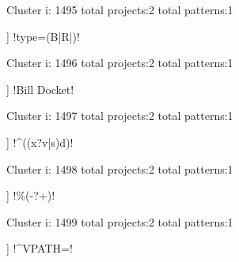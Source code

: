 Cluster i: 1495
total projects:2
total patterns:1
\begin{multicols}{1}
\begin{description}[noitemsep,topsep=0pt]
\item [[2] ] \cverb!type=(B|R|)!
\end{description}
\end{multicols}







Cluster i: 1496
total projects:2
total patterns:1
\begin{multicols}{1}
\begin{description}[noitemsep,topsep=0pt]
\item [[2] ] \cverb!Bill Docket!
\end{description}
\end{multicols}







Cluster i: 1497
total projects:2
total patterns:1
\begin{multicols}{1}
\begin{description}[noitemsep,topsep=0pt]
\item [[2] ] \cverb!^((x?v|s)d)!
\end{description}
\end{multicols}







Cluster i: 1498
total projects:2
total patterns:1
\begin{multicols}{1}
\begin{description}[noitemsep,topsep=0pt]
\item [[2] ] \cverb!\%(-?\w+)!
\end{description}
\end{multicols}







Cluster i: 1499
total projects:2
total patterns:1
\begin{multicols}{1}
\begin{description}[noitemsep,topsep=0pt]
\item [[2] ] \cverb!^VPATH\s*=!
\end{description}
\end{multicols}







